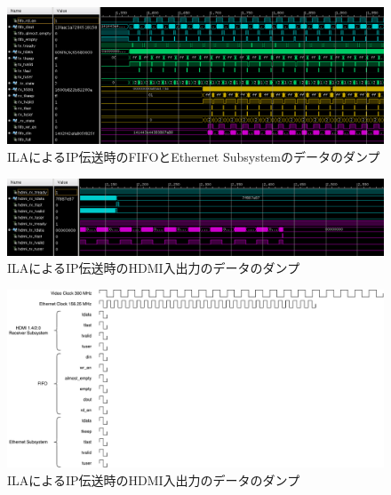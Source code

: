 \begin{figure}[htbp]
  \begin{center}
    \includegraphics[bb=0 0 1201 438,width=15.5cm]{img/fpga-ila-fifo-to-eth.png}
  \end{center}
  \caption{ILAによるIP伝送時のFIFOとEthernet Subsystemのデータのダンプ}
  \label{fig:fpga-ila-fifo-to-eth}
\end{figure}

\begin{figure}[htbp]
  \begin{center}
    \includegraphics[bb=0 0 1199 246,width=15.5cm]{img/fpga-ila-hdmi.png}
  \end{center}
  \caption{ILAによるIP伝送時のHDMI入出力のデータのダンプ}
  \label{fig:fpga-ila-hdmi}
\end{figure}

\begin{figure}[htbp]
  \begin{center}
    \includegraphics[bb=0 0 1062 501,width=22.5cm,angle=90]{img/fpga-waveform.pdf}
  \end{center}
  \caption{ILAによるIP伝送時のHDMI入出力のデータのダンプ}
  \label{fig:fpga-waveform}
\end{figure}

